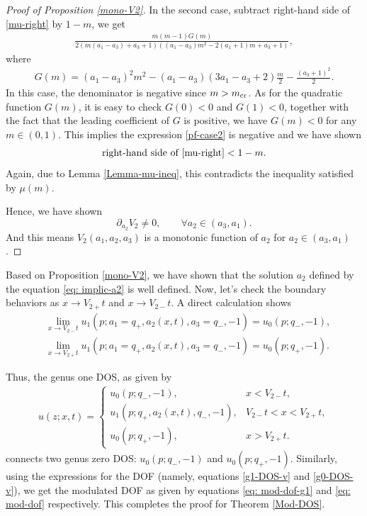 \documentclass[pdftex]{sigma}
\numberwithin{equation}{section}
\def\ra{\rightarrow}
\begin{document}
\begin{proof}[Proof of Proposition \ref{mono-V2}]
In the second case, subtract right-hand side of \eqref{mu-right} by $1-m$, we get
\begin{align}
\frac{m(m-1) G(m)}{2(m(a_1-a_3)+a_3+1)((a_1-a_3)m^2-2(a_1+1)m+a_3+1)},\label{pf-case2}
\end{align}
where \begin{align*}
G(m)=(a_1-a_3)^2m^2-(a_1-a_3)(3a_1-a_3+2)\frac{m}{2}-\frac{(a_3+1)^2}{2}.
\end{align*}
In this case, the denominator is negative since $m>m_{\rm cr}$. As for the quadratic function $G(m)$, it is easy to check $G(0)<0$ and $G(1)<0$, together with the fact that the leading coefficient of $G$ is positive, we have $G(m)<0$ for any $m\in (0,1)$. This implies the expression \eqref{pf-case2} is negative and we have shown
\begin{align*}
\text{right-hand side of \eqref{mu-right}}<1-m.
\end{align*}
Again, due to Lemma \ref{Lemma-mu-ineq}, this contradicts the inequality satisfied by $\mu(m)$.

Hence, we have shown
\[\partial_{a_2}V_2\neq 0,\qquad \forall a_2\in (a_3,a_1).\]
And this means $V_2(a_1,a_2,a_3)$ is a monotonic function of $a_2$ for $a_2\in (a_3,a_1)$.
\end{proof}

Based on Proposition \ref{mono-V2}, we have shown that the solution $a_2$ defined by the equation \eqref{eq: implic-a2} is well defined. Now, let's check the boundary behaviors as $x\ra V_{2+}t$ and $x\ra V_{2-}t$. A direct calculation shows
\begin{align*}
&\lim_{x\ra V_{2-}t}u_1(p;a_1=q_+,a_2(x,t),a_3=q_-,-1)=u_0(p;q_-,-1),\\
&\lim_{x\ra V_{2+}t}u_1(p;a_1=q_+,a_2(x,t),a_3=q_-,-1)=u_0(p;q_+,-1).
\end{align*}

Thus, the genus one DOS, as given by
\begin{align*}
u(z;x,t)=\begin{cases}
u_0(p;q_-,-1),& x<V_{2-}t,\\
u_1(p;q_+,a_2(x,t),q_-,-1),& V_{2-}t<x<V_{2+}t,\\
u_0(p;q_+,-1),& x>V_{2+}t.
\end{cases}%
\end{align*}
connects two genus zero DOS: $u_0(p;q_-,-1)$ and $u_0(p;q_+,-1)$. Similarly, using the expressions for the DOF (namely, equations \eqref{g1-DOS-v} and \eqref{g0-DOS-v}), we get the modulated DOF as given by equations \eqref{eq: mod-dof-g1} and \eqref{eq: mod-dof} respectively. This completes the proof for Theorem \ref{Mod-DOS}.
\end{document}
